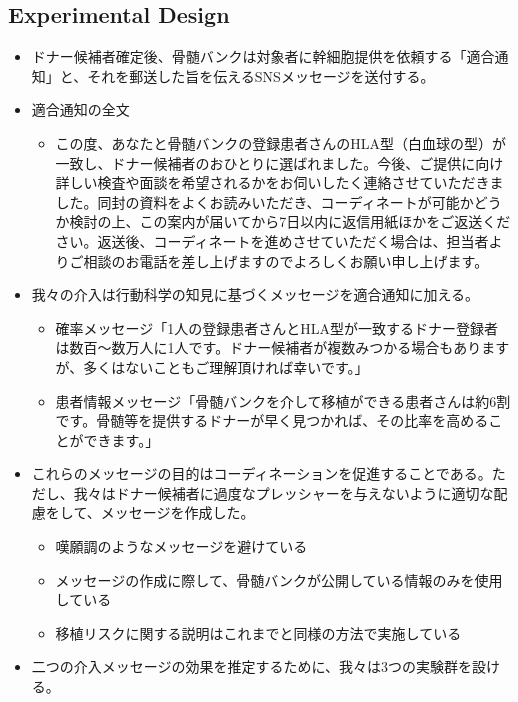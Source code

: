 \documentclass[
  a4paperpaper,
]{article}
\providecommand{\tightlist}{%
  \setlength{\itemsep}{0pt}\setlength{\parskip}{0pt}}\usepackage{longtable,booktabs,array}
\begin{document}
\hypertarget{experimental-design}{%
\subsection{Experimental Design}\label{experimental-design}}

\begin{itemize}
\tightlist
\item
  ドナー候補者確定後、骨髄バンクは対象者に幹細胞提供を依頼する「適合通知」と、それを郵送した旨を伝えるSNSメッセージを送付する。
\item
  適合通知の全文

  \begin{itemize}
  \tightlist
  \item
    この度、あなたと骨髄バンクの登録患者さんのHLA型（白血球の型）が一致し、ドナー候補者のおひとりに選ばれました。今後、ご提供に向け詳しい検査や面談を希望されるかをお伺いしたく連絡させていただきました。同封の資料をよくお読みいただき、コーディネートが可能かどうか検討の上、この案内が届いてから7日以内に返信用紙ほかをご返送ください。返送後、コーディネートを進めさせていただく場合は、担当者よりご相談のお電話を差し上げますのでよろしくお願い申し上げます。
  \end{itemize}
\item
  我々の介入は行動科学の知見に基づくメッセージを適合通知に加える。

  \begin{itemize}
  \tightlist
  \item
    確率メッセージ「1人の登録患者さんとHLA型が一致するドナー登録者は数百〜数万人に1人です。ドナー候補者が複数みつかる場合もありますが、多くはないこともご理解頂ければ幸いです。」
  \item
    患者情報メッセージ「骨髄バンクを介して移植ができる患者さんは約6割です。骨髄等を提供するドナーが早く見つかれば、その比率を高めることができます。」
  \end{itemize}
\item
  これらのメッセージの目的はコーディネーションを促進することである。ただし、我々はドナー候補者に過度なプレッシャーを与えないように適切な配慮をして、メッセージを作成した。

  \begin{itemize}
  \tightlist
  \item
    嘆願調のようなメッセージを避けている
  \item
    メッセージの作成に際して、骨髄バンクが公開している情報のみを使用している
  \item
    移植リスクに関する説明はこれまでと同様の方法で実施している
  \end{itemize}
\item
  二つの介入メッセージの効果を推定するために、我々は3つの実験群を設ける。


\end{itemize}
\end{document}
